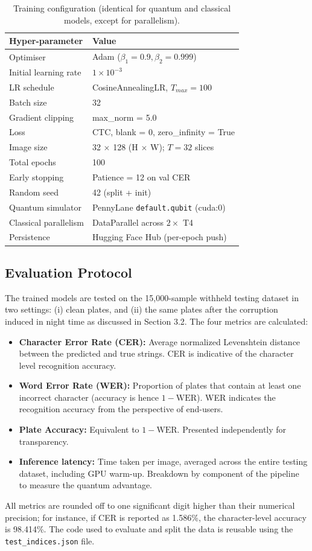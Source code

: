 \documentclass{ieeeaccess}
\begin{document}
\begin{table}[h]
\centering
\caption{Training configuration (identical for quantum and classical models, except for parallelism).}
\label{tab:training}
\begin{tabularx}{\columnwidth}{@{}lX@{}}
\toprule
\textbf{Hyper-parameter} & \textbf{Value} \\
\midrule
Optimiser & Adam ($\beta_1=0.9, \beta_2=0.999$) \\
Initial learning rate & $1 \times 10^{-3}$ \\
LR schedule & CosineAnnealingLR, $T_{max} = 100$ \\
Batch size & 32 \\
Gradient clipping & max\_norm = 5.0 \\
Loss & CTC, blank = 0, zero\_infinity = True \\
Image size & 32 $\times$ 128 (H $\times$ W); $T = 32$ slices \\
Total epochs & 100 \\
Early stopping & Patience = 12 on val CER \\
Random seed & 42 (split + init) \\
Quantum simulator & PennyLane \texttt{default.qubit} (cuda:0) \\
Classical parallelism & DataParallel across $2\times$ T4 \\
Persistence & Hugging Face Hub (per-epoch push) \\
\bottomrule
\end{tabularx}
\end{table}

\subsection{Evaluation Protocol}
The trained models are tested on the 15,000-sample withheld testing dataset in two settings: (i) clean plates, and (ii) the same plates after the corruption induced in night time as discussed in Section 3.2. The four metrics are calculated:
\begin{itemize}
\item \textbf{Character Error Rate (CER):} Average normalized Levenshtein distance \cite{b36} between the predicted and true strings. CER is indicative of the character level recognition accuracy.
\item \textbf{Word Error Rate (WER):} Proportion of plates that contain at least one incorrect character (accuracy is hence $1 - \text{WER}$). WER indicates the recognition accuracy from the perspective of end-users.
\item \textbf{Plate Accuracy:} Equivalent to $1 - \text{WER}$. Presented independently for transparency.
\item \textbf{Inference latency:} Time taken per image, averaged across the entire testing dataset, including GPU warm-up. Breakdown by component of the pipeline to measure the quantum advantage.
\end{itemize}
All metrics are rounded off to one significant digit higher than their numerical precision; for instance, if CER is reported as 1.586\%, the character-level accuracy is 98.414\%. The code used to evaluate and split the data is reusable using the \texttt{test\_indices.json} file.
\end{document}
